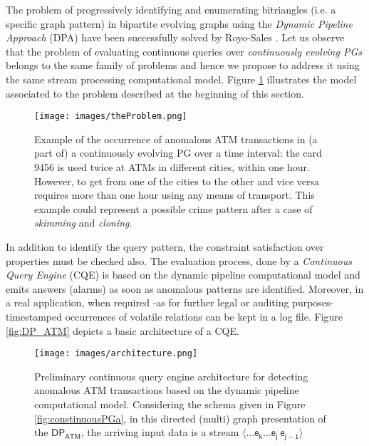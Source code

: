 {The problem of progressively identifying and enumerating bitriangles 
(i.e. a specific graph pattern) 
in bipartite evolving graphs using the 
\emph{Dynamic Pipeline Approach} (DPA)\cite{DP-pasarella2024computational} 
have been successfully solved by Royo-Sales \cite{DP-bitriangles2021}.  
Let us observe that the problem of evaluating continuous queries over 
\emph{continuously evolving PGs} 
belongs to the same family of problems and hence we propose to address 
it using the same stream 
processing computational model.
Figure \ref{fig:theProblem} illustrates the model associated to the problem described at 
the beginning of this section. 
%
\begin{figure}[h]
         \centering
         \texttt{[image: images/theProblem.png]}
         \caption{Example of the occurrence of anomalous ATM transactions in (a part of) 
         a continuously evolving PG over a time interval: the card \textsf{9456} is used twice at ATMs 
         in different cities, within one hour. 
         However, to get from one of the cities to the other and vice versa requires more 
         than one hour using any means of transport. 
         This example could represent a possible 
         crime pattern after a case of \emph{skimming} and \emph{cloning}.}
         \label{fig:theProblem}
\end{figure}
%
In addition to identify the query pattern, the constraint satisfaction 
over properties must be checked also.  
The evaluation process, done by a \emph{Continuous Query Engine} (CQE) 
is based on the dynamic pipeline computational 
model \cite{DP-pasarella2024computational} and  
emits  answers (alarms) as soon as anomalous patterns are identified. 
Moreover, in a real application,  
when required -as for further legal or auditing purposes- 
timestamped occurrences of volatile relations can  be kept in a log file. 
Figure \ref{fig:DP_ATM} depicts a basic architecture of a CQE.
%
\begin{figure}[h]
         \centering
         \texttt{[image: images/architecture.png]}
         \caption{Preliminary continuous query engine architecture for detecting anomalous 
         ATM transactions based on the dynamic pipeline computational model. 
         Considering the schema given in Figure \ref{fig:constinuousPGa}, 
         in this directed (multi) graph presentation of the $\mathsf{DP_{ATM}}$, 
         the arriving input data is a stream  $\mathsf{\langle \dots e_k\dots e_j \: e_{j-1}\rangle}$ 
}
\end{figure}}
